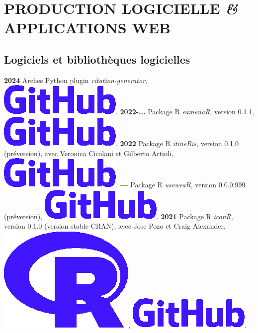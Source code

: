 \documentclass{article}
\begin{document}
\section{PRODUCTION LOGICIELLE \textit{\&} APPLICATIONS WEB}

\subsection*{Logiciels et bibliothèques logicielles}

\textbf{2024 }Arches \textsf{Python} plugin \textit{citation-generator}, \href{https://github.com/eamena-project/eamena-arches-dev/tree/main/dbs/database.eamena/citation#readme}{\includegraphics[scale=0.1]{app-github-rect.png}}.
\smallbreak
\textbf{2022-... }Package \textsf{R} \textit{eamenaR}, version 0.1.1, \href{https://github.com/eamena-project/eamenaR/tree/main#readme}{\includegraphics[scale=0.1]{app-github-rect.png}}.
\smallbreak
\textbf{2022 }Package \textsf{R} \textit{itineRis}, version 0.1.0 (préversion), avec Veronica Cicolani et Gilberto Artioli, \href{https://github.com/zoometh/itineRis/tree/main#readme}{\includegraphics[scale=0.1]{app-github-rect.png}}.
\textbf{--- }Package \textsf{R} \textit{useweaR}, version 0.0.0.999 (préversion), \href{https://github.com/zoometh/itineRis/tree/main#readme}{\includegraphics[scale=0.1]{app-github-rect.png}}.
\smallbreak
\textbf{2021 }Package \textsf{R} \textit{iconR}, version 0.1.0 (version stable CRAN), avec Jose Pozo et Craig Alexander, \href{https://cran.r-project.org/web/packages/iconr/index.html}{\includegraphics[scale=0.04]{prog-r.png}}, \href{https://github.com/zoometh/iconr#readme}{\includegraphics[scale=0.1]{app-github-rect.png}}.
\end{document}
